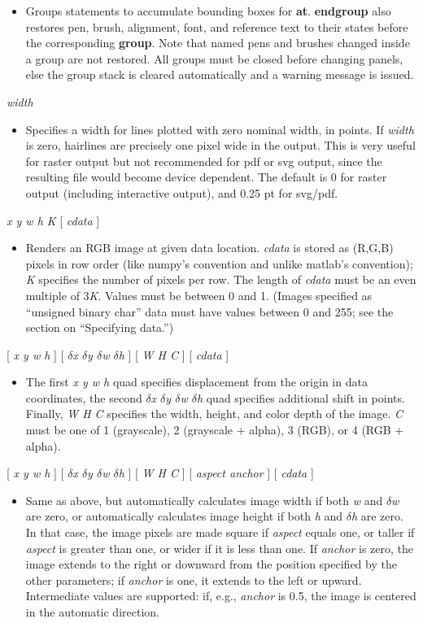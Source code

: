 \documentclass[11pt]{article}
\def\cmd#1#2{\noindent {\bf #1} #2\par}
\def\expl#1{\kern-8pt\begin{itemize}\item[]#1\end{itemize}}
\def\cref#1{{\bf #1}}
\begin{document}
\cmd{group}{}
\cmd{endgroup}{}
\expl{Groups statements to accumulate bounding boxes for
  \cref{at}. \cref{endgroup} also restores pen, brush, alignment,
  font, and
  reference text to their states before the corresponding
  \cref{group}. Note that named pens and brushes changed inside a
  group are not restored. All groups must be closed before changing
  panels, else the group stack is cleared automatically and a warning
  message is issued. }

\cmd{hairline}{\emph{width}} \expl{Specifies a width for lines plotted
  with zero nominal width, in points. If \emph{width} is zero,
  hairlines are precisely one pixel wide in the output. This is very
  useful for raster output but not recommended for pdf or svg output,
  since the resulting file would become device dependent. The default
  is 0 for raster output (including interactive output), and 0.25 pt
  for svg/pdf.}

\cmd{image}{\emph{x y w h K} [ \emph{cdata} ]} \expl{Renders an RGB
  image at given data location. \emph{cdata} is stored as (R,G,B)
  pixels in row order (like numpy's convention and unlike matlab's
  convention); \emph{K} specifies the number of pixels per row. The
  length of \emph{cdata} must be an even multiple of 3\emph{K}. Values
  must be between 0 and 1. (Images specified as ``unsigned  binary
  char'' data must have
  values between 0 and 255; see the section on ``Specifying data.'')}

\cmd{image}{[ \emph{x y w h} ]
  [ \emph{$\delta$x $\delta$y $\delta$w $\delta$h} ] [ \emph{W H C} ] [
    \emph{cdata} ]}
 \expl{The first \emph{x y w h} quad specifies displacement from the origin
in data coordinates, the second  \emph{$\delta$x $\delta$y $\delta$w
  $\delta$h} quad specifies additional shift in points. Finally,
\emph{W H C} specifies the width, height, and color depth of the
image. \emph{C} must be one of 1 (grayscale), 2 (grayscale + alpha), 3
(RGB), or 4 (RGB + alpha).}

\cmd{image}{[ \emph{x y w h} ] [ \emph{$\delta$x $\delta$y $\delta$w
      $\delta$h} ] [ \emph{W H C} ] [ \emph{aspect anchor} ] [
    \emph{cdata} ]} \expl{Same as above, but automatically calculates
  image width if both \emph{w} and \emph{$\delta$w} are zero, or
  automatically calculates image height if both \emph{h} and
  \emph{$\delta$h} are zero. In that case, the image pixels are made
  square if \emph{aspect} equals one, or taller if \emph{aspect} is greater than one, or wider if it is less than one. If \emph{anchor} is zero, the image extends to the right or downward from the position specified by the other parameters; if \emph{anchor} is one, it extends to the left or upward. Intermediate values are supported: if, e.g., \emph{anchor} is 0.5, the image is centered in the automatic direction.}
 
\end{document}
